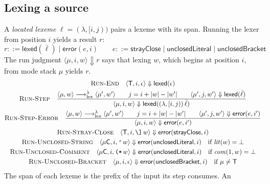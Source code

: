 \documentclass[11pt]{article}
\numberwithin{equation}{section}
\newcommand{\kw}[1]{\ensuremath{\mathsf{#1}}}
\newcommand{\str}[1]{\ensuremath{\text{\texttt{#1}}}}
\newcommand{\bs}{\textbackslash}
\newcommand{\Close}{\str{\bs]}}
\newcommand{\TM}{\kw{T}}
\newcommand{\CM}{\kw{C}}
\newcommand{\lexto}{\longrightarrow_{\mathrm{lex}}}
\newcommand{\rulelabel}[1]{\textsc{#1}}
\begin{document}
\subsection{Lexing a source}
\label{sec:lexical-errors}

A \emph{located lexeme} $\ell = (\lambda, [i,j))$ pairs a lexeme with its
span.  Running the lexer from position $i$ yields a result $r$:
\begin{equation}\label{eq:lex-results}
r ::= \kw{lexed}(\bar\ell) \mid \kw{error}(e, i)
\qquad
e ::= \kw{strayClose} \mid \kw{unclosedLiteral} \mid \kw{unclosedBracket}
\end{equation}
The run judgment $\langle \mu, i, w \rangle \Downarrow r$ says that lexing
$w$, which begins at position $i$, from mode stack $\mu$ yields $r$.
\begin{gather}
\label{eq:run-end}
\rulelabel{Run-End}\quad
\langle \TM, i, \epsilon \rangle \Downarrow \kw{lexed}(\epsilon)
\\
\label{eq:run-step}
\rulelabel{Run-Step}\quad
\frac{\langle \mu, w \rangle \lexto^{\lambda} \langle \mu', w' \rangle
      \qquad j = i + |w| - |w'|
      \qquad \langle \mu', j, w' \rangle \Downarrow \kw{lexed}(\bar\ell)}
     {\langle \mu, i, w \rangle \Downarrow
      \kw{lexed}((\lambda, [i,j))\,\bar\ell)}
\\
\label{eq:run-step-error}
\rulelabel{Run-Step-Error}\quad
\frac{\langle \mu, w \rangle \lexto^{\lambda} \langle \mu', w' \rangle
      \qquad j = i + |w| - |w'|
      \qquad \langle \mu', j, w' \rangle \Downarrow \kw{error}(e, i')}
     {\langle \mu, i, w \rangle \Downarrow \kw{error}(e, i')}
\\
\label{eq:run-stray-close}
\rulelabel{Run-Stray-Close}\quad
\langle \TM, i, \Close\,w \rangle \Downarrow \kw{error}(\kw{strayClose}, i)
\\
\label{eq:run-unclosed-string}
\rulelabel{Run-Unclosed-String}\quad
\langle \mu\CM, i, \str{'}\,w \rangle \Downarrow
  \kw{error}(\kw{unclosedLiteral}, i)
  \quad\text{if } \mathit{lit}(w) = \bot
\\
\label{eq:run-unclosed-comment}
\rulelabel{Run-Unclosed-Comment}\quad
\langle \mu\CM, i, \str{(*}\,w \rangle \Downarrow
  \kw{error}(\kw{unclosedLiteral}, i)
  \quad\text{if } \mathit{com}(1, w) = \bot
\\
\label{eq:run-unclosed-bracket}
\rulelabel{Run-Unclosed-Bracket}\quad
\langle \mu, i, \epsilon \rangle \Downarrow \kw{error}(\kw{unclosedBracket}, i)
  \quad\text{if } \mu \ne \TM
\end{gather}
The span of each lexeme is the prefix of the input its step consumes.  An
\end{document}
